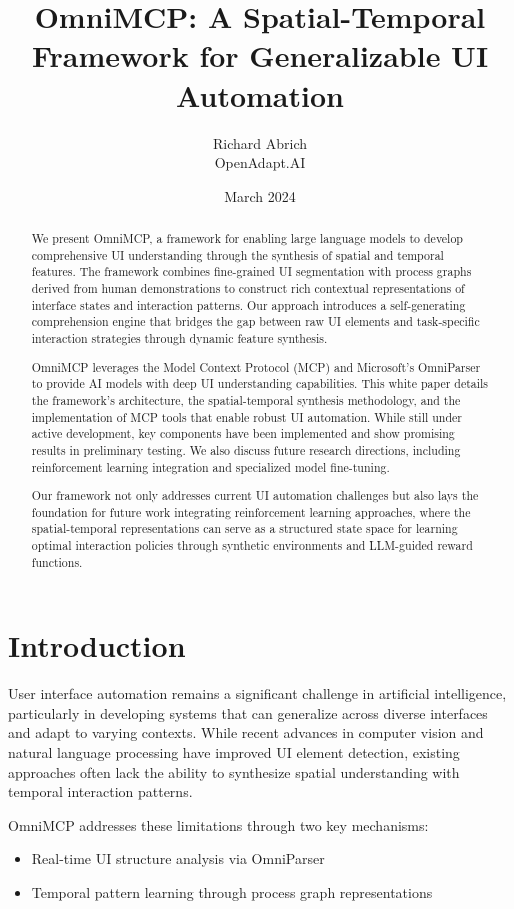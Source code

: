 \documentclass{article}
\title{OmniMCP: A Spatial-Temporal Framework for Generalizable UI Automation}
\author{Richard Abrich \\ OpenAdapt.AI}
\date{March 2024}
\begin{document}
\maketitle

\begin{abstract}
We present OmniMCP, a framework for enabling large language models to develop comprehensive UI understanding through the synthesis of spatial and temporal features. The framework combines fine-grained UI segmentation with process graphs derived from human demonstrations to construct rich contextual representations of interface states and interaction patterns. Our approach introduces a self-generating comprehension engine that bridges the gap between raw UI elements and task-specific interaction strategies through dynamic feature synthesis.

OmniMCP leverages the Model Context Protocol (MCP) and Microsoft's OmniParser to provide AI models with deep UI understanding capabilities. This white paper details the framework's architecture, the spatial-temporal synthesis methodology, and the implementation of MCP tools that enable robust UI automation. While still under active development, key components have been implemented and show promising results in preliminary testing. We also discuss future research directions, including reinforcement learning integration and specialized model fine-tuning.

Our framework not only addresses current UI automation challenges but also lays the foundation for future work integrating reinforcement learning approaches, where the spatial-temporal representations can serve as a structured state space for learning optimal interaction policies through synthetic environments and LLM-guided reward functions.
\end{abstract}

\section{Introduction}

User interface automation remains a significant challenge in artificial intelligence, particularly in developing systems that can generalize across diverse interfaces and adapt to varying contexts. While recent advances in computer vision and natural language processing have improved UI element detection, existing approaches often lack the ability to synthesize spatial understanding with temporal interaction patterns.

OmniMCP addresses these limitations through two key mechanisms:
\begin{itemize}
    \item Real-time UI structure analysis via OmniParser
    \item Temporal pattern learning through process graph representations
\end{itemize}
\end{document}
